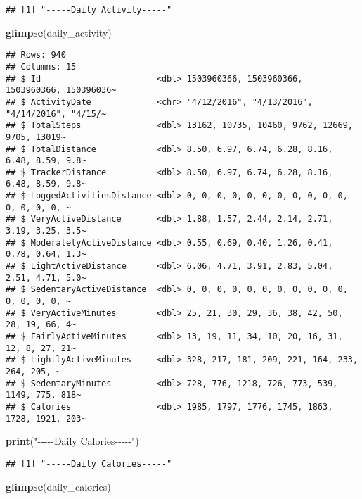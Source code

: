 \documentclass[
]{article}
\newenvironment{Shaded}{\begin{snugshade}}{\end{snugshade}}
\newcommand{\FunctionTok}[1]{\textcolor[rgb]{0.13,0.29,0.53}{\textbf{#1}}}
\newcommand{\NormalTok}[1]{#1}
\newcommand{\StringTok}[1]{\textcolor[rgb]{0.31,0.60,0.02}{#1}}
\begin{document}
\begin{verbatim}
## [1] "-----Daily Activity-----"
\end{verbatim}

\begin{Shaded}
\begin{Highlighting}[]
\FunctionTok{glimpse}\NormalTok{(daily\_activity)}
\end{Highlighting}
\end{Shaded}

\begin{verbatim}
## Rows: 940
## Columns: 15
## $ Id                       <dbl> 1503960366, 1503960366, 1503960366, 150396036~
## $ ActivityDate             <chr> "4/12/2016", "4/13/2016", "4/14/2016", "4/15/~
## $ TotalSteps               <dbl> 13162, 10735, 10460, 9762, 12669, 9705, 13019~
## $ TotalDistance            <dbl> 8.50, 6.97, 6.74, 6.28, 8.16, 6.48, 8.59, 9.8~
## $ TrackerDistance          <dbl> 8.50, 6.97, 6.74, 6.28, 8.16, 6.48, 8.59, 9.8~
## $ LoggedActivitiesDistance <dbl> 0, 0, 0, 0, 0, 0, 0, 0, 0, 0, 0, 0, 0, 0, 0, ~
## $ VeryActiveDistance       <dbl> 1.88, 1.57, 2.44, 2.14, 2.71, 3.19, 3.25, 3.5~
## $ ModeratelyActiveDistance <dbl> 0.55, 0.69, 0.40, 1.26, 0.41, 0.78, 0.64, 1.3~
## $ LightActiveDistance      <dbl> 6.06, 4.71, 3.91, 2.83, 5.04, 2.51, 4.71, 5.0~
## $ SedentaryActiveDistance  <dbl> 0, 0, 0, 0, 0, 0, 0, 0, 0, 0, 0, 0, 0, 0, 0, ~
## $ VeryActiveMinutes        <dbl> 25, 21, 30, 29, 36, 38, 42, 50, 28, 19, 66, 4~
## $ FairlyActiveMinutes      <dbl> 13, 19, 11, 34, 10, 20, 16, 31, 12, 8, 27, 21~
## $ LightlyActiveMinutes     <dbl> 328, 217, 181, 209, 221, 164, 233, 264, 205, ~
## $ SedentaryMinutes         <dbl> 728, 776, 1218, 726, 773, 539, 1149, 775, 818~
## $ Calories                 <dbl> 1985, 1797, 1776, 1745, 1863, 1728, 1921, 203~
\end{verbatim}

\begin{Shaded}
\begin{Highlighting}[]
\FunctionTok{print}\NormalTok{(}\StringTok{"{-}{-}{-}{-}{-}Daily Calories{-}{-}{-}{-}{-}"}\NormalTok{)}
\end{Highlighting}
\end{Shaded}

\begin{verbatim}
## [1] "-----Daily Calories-----"
\end{verbatim}

\begin{Shaded}
\begin{Highlighting}[]
\FunctionTok{glimpse}\NormalTok{(daily\_calories)}
\end{Highlighting}
\end{Shaded}
\end{document}
